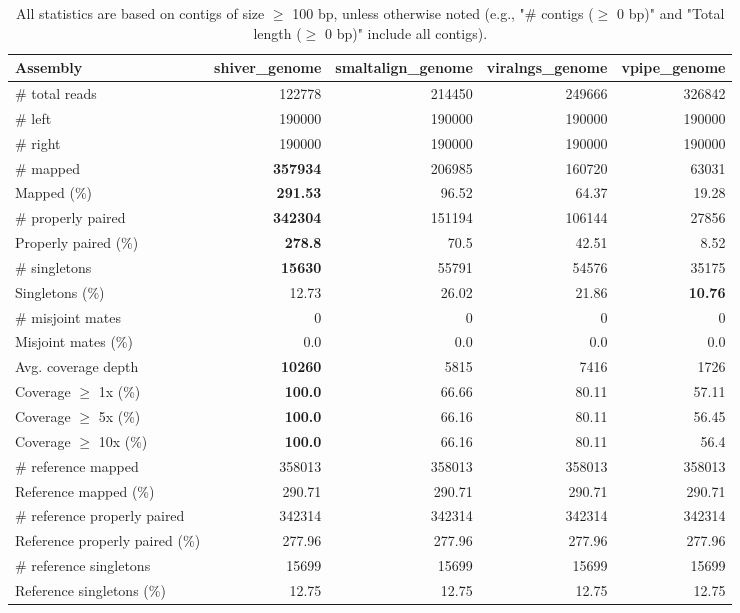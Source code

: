 \documentclass[12pt,a4paper]{article}
\begin{document}
\begin{table}[ht]
\begin{center}
\caption{All statistics are based on contigs of size $\geq$ 100 bp, unless otherwise noted (e.g., "\# contigs ($\geq$ 0 bp)" and "Total length ($\geq$ 0 bp)" include all contigs).}
\begin{tabular}{|l*{4}{|r}|}
\hline
Assembly & shiver\_genome & smaltalign\_genome & viralngs\_genome & vpipe\_genome \\ \hline
\# total reads & 122778 & 214450 & 249666 & 326842 \\ \hline
\# left & 190000 & 190000 & 190000 & 190000 \\ \hline
\# right & 190000 & 190000 & 190000 & 190000 \\ \hline
\# mapped & {\bf 357934} & 206985 & 160720 & 63031 \\ \hline
Mapped (\%) & {\bf 291.53} & 96.52 & 64.37 & 19.28 \\ \hline
\# properly paired & {\bf 342304} & 151194 & 106144 & 27856 \\ \hline
Properly paired (\%) & {\bf 278.8} & 70.5 & 42.51 & 8.52 \\ \hline
\# singletons & {\bf 15630} & 55791 & 54576 & 35175 \\ \hline
Singletons (\%) & 12.73 & 26.02 & 21.86 & {\bf 10.76} \\ \hline
\# misjoint mates & 0 & 0 & 0 & 0 \\ \hline
Misjoint mates (\%) & 0.0 & 0.0 & 0.0 & 0.0 \\ \hline
Avg. coverage depth & {\bf 10260} & 5815 & 7416 & 1726 \\ \hline
Coverage $\geq$ 1x (\%) & {\bf 100.0} & 66.66 & 80.11 & 57.11 \\ \hline
Coverage $\geq$ 5x (\%) & {\bf 100.0} & 66.16 & 80.11 & 56.45 \\ \hline
Coverage $\geq$ 10x (\%) & {\bf 100.0} & 66.16 & 80.11 & 56.4 \\ \hline
\# reference mapped & 358013 & 358013 & 358013 & 358013 \\ \hline
Reference mapped (\%) & 290.71 & 290.71 & 290.71 & 290.71 \\ \hline
\# reference properly paired & 342314 & 342314 & 342314 & 342314 \\ \hline
Reference properly paired (\%) & 277.96 & 277.96 & 277.96 & 277.96 \\ \hline
\# reference singletons & 15699 & 15699 & 15699 & 15699 \\ \hline
Reference singletons (\%) & 12.75 & 12.75 & 12.75 & 12.75 \\ \hline

\end{tabular}
\end{center}
\end{table}
\end{document}
